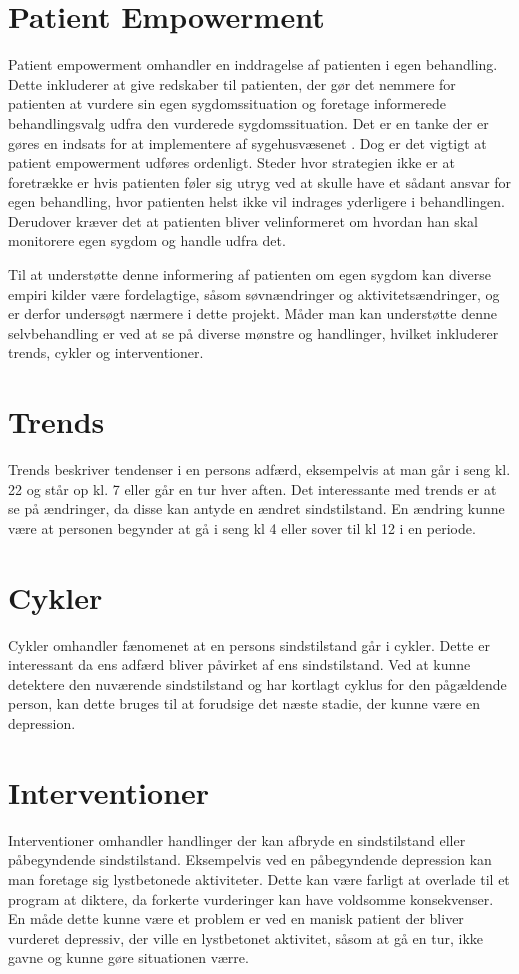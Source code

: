 \section{Patient Empowerment}\label{sec:patientempowerment}
Patient empowerment omhandler en inddragelse af patienten i egen behandling.
Dette inkluderer at give redskaber til patienten, der gør det nemmere for patienten at vurdere sin egen sygdomssituation og foretage informerede behandlingsvalg udfra den vurderede sygdomssituation.
Det er en tanke der er gøres en indsats for at implementere af sygehusvæsenet \citep{misc:patientpowerhovedstaden}.
Dog er det vigtigt at patient empowerment udføres ordenligt.
Steder hvor strategien ikke er at foretrække er hvis patienten føler sig utryg ved at skulle have et sådant ansvar for egen behandling, hvor patienten helst ikke vil indrages yderligere i behandlingen.
Derudover kræver det at patienten bliver velinformeret om hvordan han skal monitorere egen sygdom og handle udfra det.

Til at understøtte denne informering af patienten om egen sygdom kan diverse empiri kilder være fordelagtige, såsom søvnændringer og aktivitetsændringer\citep{misc:jorgen-aagaard}, og er derfor undersøgt nærmere i dette projekt.
Måder man kan understøtte denne selvbehandling er ved at se på diverse mønstre og handlinger, hvilket inkluderer trends, cykler og interventioner.

\section{Trends}
Trends beskriver tendenser i en persons adfærd, eksempelvis at man går i seng kl. 22 og står op kl. 7 eller går en tur hver aften.
Det interessante med trends er at se på ændringer, da disse kan antyde en ændret sindstilstand.
En ændring kunne være at personen begynder at gå i seng kl 4 eller sover til kl 12 i en periode.

\section{Cykler}
Cykler omhandler fænomenet at en persons sindstilstand går i cykler.
Dette er interessant da ens adfærd bliver påvirket af ens sindstilstand.
Ved at kunne detektere den nuværende sindstilstand og har kortlagt cyklus for den pågældende person, kan dette bruges til at forudsige det næste stadie, der kunne være en depression.

\section{Interventioner}
Interventioner omhandler handlinger der kan afbryde en sindstilstand eller påbegyndende sindstilstand.
Eksempelvis ved en påbegyndende depression kan man foretage sig lystbetonede aktiviteter.
Dette kan være farligt at overlade til et program at diktere, da forkerte vurderinger kan have voldsomme konsekvenser.
En måde dette kunne være et problem er ved en manisk patient der bliver vurderet depressiv, der ville en lystbetonet aktivitet, såsom at gå en tur, ikke gavne og kunne gøre situationen værre.